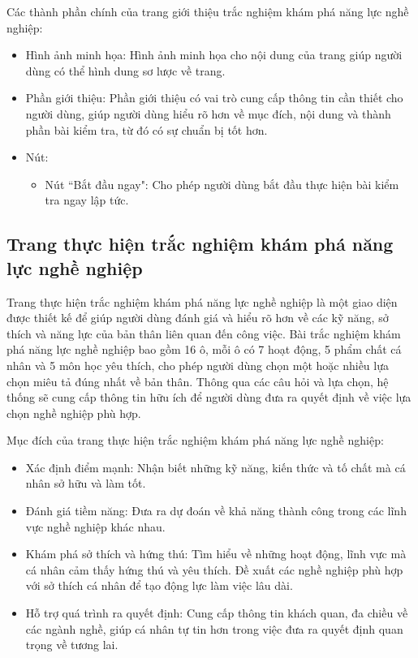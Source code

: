 Các thành phần chính của trang giới thiệu trắc nghiệm khám phá năng lực nghề nghiệp:
\begin{itemize}
    \item Hình ảnh minh họa: Hình ảnh minh họa cho nội dung của trang giúp người dùng có thể hình dung sơ lược về trang.
    \item Phần giới thiệu: Phần giới thiệu có vai trò cung cấp thông tin cần thiết cho người dùng, giúp người dùng hiểu rõ hơn về mục đích, nội dung và thành phần bài kiểm tra, từ đó có sự chuẩn bị tốt hơn.
    \item Nút:
        \begin{itemize}
            \item Nút ``Bắt đầu ngay": Cho phép người dùng bắt đầu thực hiện bài kiểm tra ngay lập tức.
        \end{itemize}
\end{itemize}


\subsection{Trang thực hiện trắc nghiệm khám phá năng lực nghề nghiệp}
Trang thực hiện trắc nghiệm khám phá năng lực nghề nghiệp là một giao diện được thiết kế để giúp người dùng đánh giá và hiểu rõ hơn về các kỹ năng, sở thích và năng lực của bản thân liên quan đến công việc. Bài trắc nghiệm khám phá năng lực nghề nghiệp bao gồm 16 ô, mỗi ô có 7 hoạt động, 5 phẩm chất cá nhân và 5 môn học yêu thích, cho phép người dùng chọn một hoặc nhiều lựa chọn miêu tả đúng nhất về bản thân. Thông qua các câu hỏi và lựa chọn, hệ thống sẽ cung cấp thông tin hữu ích để người dùng đưa ra quyết định về việc lựa chọn nghề nghiệp phù hợp.

Mục đích của trang thực hiện trắc nghiệm khám phá năng lực nghề nghiệp:
\begin{itemize}
    \item Xác định điểm mạnh: Nhận biết những kỹ năng, kiến thức và tố chất mà cá nhân sở hữu và làm tốt.
    \item Đánh giá tiềm năng: Đưa ra dự đoán về khả năng thành công trong các lĩnh vực nghề nghiệp khác nhau.
    \item Khám phá sở thích và hứng thú: Tìm hiểu về những hoạt động, lĩnh vực mà cá nhân cảm thấy hứng thú và yêu thích. Đề xuất các nghề nghiệp phù hợp với sở thích cá nhân để tạo động lực làm việc lâu dài.
    \item Hỗ trợ quá trình ra quyết định: Cung cấp thông tin khách quan, đa chiều về các ngành nghề, giúp cá nhân tự tin hơn trong việc đưa ra quyết định quan trọng về tương lai.
\end{itemize}

